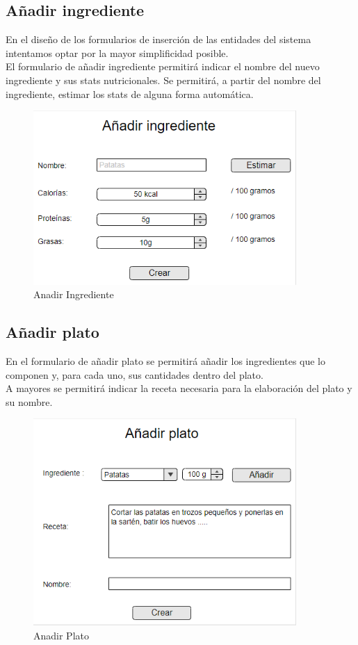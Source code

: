 \documentclass[12pt, a4paper, twoside]{book}
\begin{document}
	\subsection{Añadir ingrediente}	

	En el diseño de los formularios de inserción de las entidades del sistema intentamos optar por la mayor simplificidad posible.\\
	El formulario de añadir ingrediente permitirá indicar el nombre del nuevo ingrediente y sus stats nutricionales. 
	Se permitirá, a partir del nombre del ingrediente, estimar los stats de alguna forma automática.

	\begin{figure}[H]
		\centering
		\includegraphics[width=10cm]{Imagenes/MockupAddIngredient.png}
		\caption{Anadir Ingrediente}\label{Anadir Ingrediente}
	\end{figure}

	\subsection{Añadir plato}	
	
	En el formulario de añadir plato se permitirá añadir los ingredientes que lo componen y, para cada uno, sus cantidades dentro del plato. \\
	A mayores se permitirá indicar la receta necesaria para la elaboración del plato y su nombre.
	
	\begin{figure}[H]
		\centering
		\includegraphics[width=10cm]{Imagenes/MockupAddDish.png}
		\caption{Anadir Plato}\label{Anadir Plato}
	\end{figure}
\end{document}
